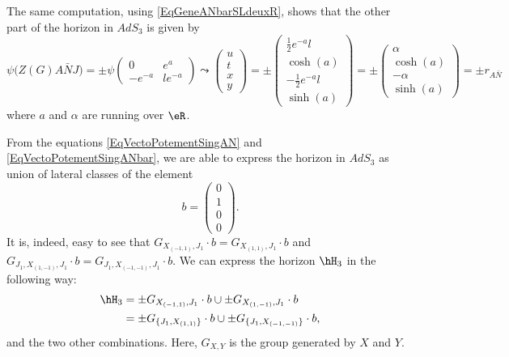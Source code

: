The same computation, using \eqref{EqGeneANbarSLdeuxR}, shows that the other part of the horizon in $AdS_3$ is given by
\begin{equation}		\label{EqVectoPotementSingANbar}
\psi\big( Z(G)A\bar NJ\big)
=
\pm\psi
\begin{pmatrix}
	0	&	e^a	\\
	- e^{-a}	&	l e^{-a}
\end{pmatrix}
\leadsto
\begin{pmatrix}
	u	\\
	t	\\
	x	\\
	y
\end{pmatrix}=
\pm
\begin{pmatrix}
	\frac{1}{ 2 } e^{-a}l	\\
	\cosh(a)	\\
	-\frac{1}{ 2 } e^{-a}l	\\
	\sinh(a)
\end{pmatrix}
=
\pm
\begin{pmatrix}
	\alpha	\\
	\cosh(a)	\\
	-\alpha	\\
	\sinh(a)
\end{pmatrix}
=\pm
r_{A\bar N}
\end{equation}
where $a$ and $\alpha$ are running over $\eR$.

From the equations \eqref{EqVectoPotementSingAN} and \eqref{EqVectoPotementSingANbar}, we are able to express the horizon in $AdS_3$ as union of lateral classes of the element
\begin{equation}
	b=\begin{pmatrix}
		0	\\
		1	\\
		0	\\
		0
	\end{pmatrix}.
\end{equation}
It is, indeed, easy to see that $G_{ X_{(-1,1)},J_1}\cdot b =G_{ X_{(1,1)},J_1}\cdot b$ and $G_{ J_1,X_{(1,-1)},J_1}\cdot b=G_{ J_1,X_{(-1,-1)} ,J_1}\cdot b$. We can express the horizon $\hH_3$ in the following way:
\begin{equation}
	\begin{aligned}[]
		\hH_3	&=\pm G_{ X_{(-1,1)},J_1}\cdot b\cup \pm G_{ X_{(1,-1)},J_1}\cdot b  \\
			&=\pm G_{ \{J_1,X_{(1,1)}\}}\cdot b\cup \pm G_{ \{J_1,X_{(-1,-1)}\}}\cdot b,
	\end{aligned}
\end{equation}
and the two other combinations. Here, $G_{X,Y}$ is the group generated by $X$ and $Y$.

